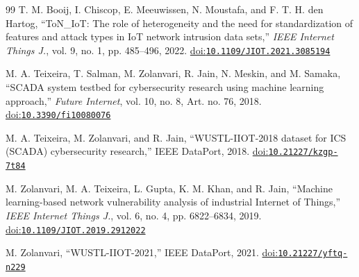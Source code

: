 \begin{thebibliography}{99}
T. M. Booij, I. Chiscop, E. Meeuwissen, N. Moustafa, and F. T. H. den Hartog, ``ToN\_IoT: The role of heterogeneity and the need for standardization of features and attack types in IoT network intrusion data sets,'' \emph{IEEE Internet Things J.}, vol. 9, no. 1, pp. 485--496, 2022. \href{https://doi.org/10.1109/JIOT.2021.3085194}{doi:\nolinkurl{10.1109/JIOT.2021.3085194}}

M. A. Teixeira, T. Salman, M. Zolanvari, R. Jain, N. Meskin, and M. Samaka, ``SCADA system testbed for cybersecurity research using machine learning approach,'' \emph{Future Internet}, vol. 10, no. 8, Art. no. 76, 2018. \href{https://doi.org/10.3390/fi10080076}{doi:\nolinkurl{10.3390/fi10080076}}

M. A. Teixeira, M. Zolanvari, and R. Jain, ``WUSTL-IIOT-2018 dataset for ICS (SCADA) cybersecurity research,'' IEEE DataPort, 2018. \href{https://doi.org/10.21227/kzgp-7t84}{doi:\nolinkurl{10.21227/kzgp-7t84}}

M. Zolanvari, M. A. Teixeira, L. Gupta, K. M. Khan, and R. Jain, ``Machine learning-based network vulnerability analysis of industrial Internet of Things,'' \emph{IEEE Internet Things J.}, vol. 6, no. 4, pp. 6822--6834, 2019. \href{https://doi.org/10.1109/JIOT.2019.2912022}{doi:\nolinkurl{10.1109/JIOT.2019.2912022}}

M. Zolanvari, ``WUSTL-IIOT-2021,'' IEEE DataPort, 2021. \href{https://doi.org/10.21227/yftq-n229}{doi:\nolinkurl{10.21227/yftq-n229}}

\end{thebibliography}
\endgroup

